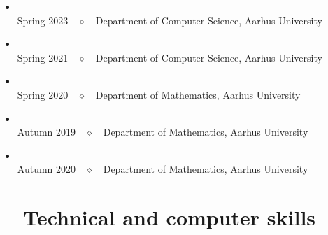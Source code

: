 \documentclass[article, a4paper, 11pt, oneside]{memoir}
\newcommand{\myitem}[3]{\item[#1] #2 \par \small #3 \par\normalsize}
\begin{document}
\begin{itemize}[label={\faAngleDoubleRight}]
    \item {} \\
    {\sffamily\small\color{graycolor}Spring 2023~~$\diamond$~~Department of Computer Science, Aarhus University}

    \item {} \\
    {\sffamily\small\color{graycolor}Spring 2021~~$\diamond$~~Department of Computer Science, Aarhus University}

    \item {} \\
    {\sffamily\small\color{graycolor}Spring 2020~~$\diamond$~~Department of Mathematics, Aarhus University}

    \item {} \\
    {\sffamily\small\color{graycolor}Autumn 2019~~$\diamond$~~Department of Mathematics, Aarhus University}

    \item {} \\
    {\sffamily\small\color{graycolor}Autumn 2020~~$\diamond$~~Department of Mathematics, Aarhus University}
\end{itemize}


    
    
    
    


\section[Technical and computer skills]{\faCode~~Technical and computer skills}
\end{document}
